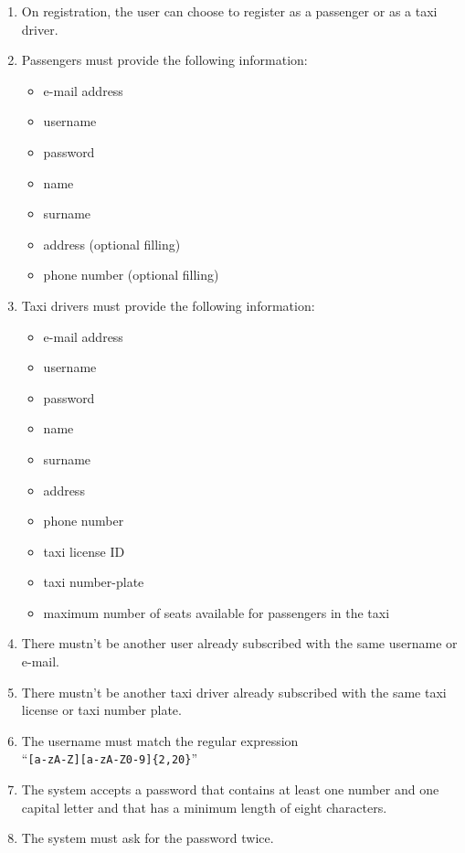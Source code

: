 \begin{enumerate}
    \item On registration, the user can choose to register as a passenger or as a taxi driver.
    \item Passengers must provide the following information:
    \begin{itemize}
        \item e-mail address
        \item username
        \item password
        \item name
        \item surname
        \item address (optional filling)
        \item phone number (optional filling)
    \end{itemize}
    \item Taxi drivers must provide the following information:
    \begin{itemize}
        \item e-mail address
        \item username
        \item password
        \item name
        \item surname
        \item address
        \item phone number
        \item taxi license ID
        \item taxi number-plate
        \item maximum number of seats available for passengers in the taxi
	   \end{itemize}
    \item There mustn't be another user already subscribed with the same username or e-mail. \label{f-sameInfo}
    \item There mustn't be another taxi driver already subscribed with the same taxi license or taxi number plate. \label{f-sameTaxi}
    \item The username must match the regular expression\\``\texttt{[a-zA-Z][a-zA-Z0-9]\{2,20\}}''    \label{f-usrn}
    \item The system accepts a password that contains at least one number and one capital letter and that has a minimum length of eight characters.  \label{f-psw1}
    \item The system must ask for the password twice.

\end{enumerate}
